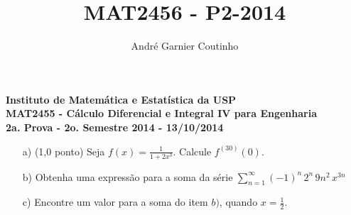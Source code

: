 \documentclass[12pt,a4paper]{article}
\title{MAT2456 - P2-2014}
\author{André Garnier Coutinho}
\begin{document}
\begin{center}
\textbf{Instituto de Matemática e Estatística da USP\\
MAT2455 - Cálculo Diferencial e Integral IV para Engenharia\\}
\textbf{2a. Prova - 2o. Semestre 2014 - 13/10/2014}
\end{center}


\begin{itemize}
	\item[a)] (1,0 ponto) Seja $ f(x) = \displaystyle\frac{1}{1+2x^3}$. Calcule $f^{(30)}(0)$.
	
	\item[b)] Obtenha uma expressão para a soma da série $\displaystyle\sum_{n=1}^\infty (-1)^n \, 2^n \, 9 n^2 \, x^{3n}$ 
	\item[c)] Encontre um valor para a soma do item $b)$, quando $x = \displaystyle\frac{1}{2}$.
\end{itemize}
\end{document}
